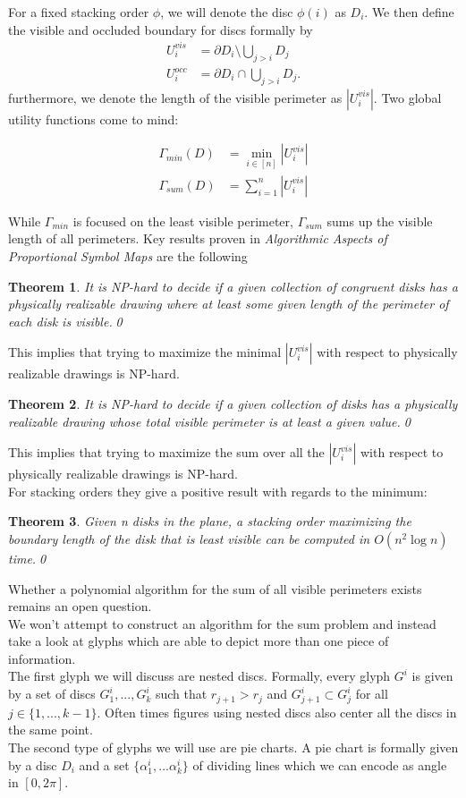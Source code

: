 \documentclass[a4paper,11pt]{article}
\newtheorem{theorem}{Theorem}
\begin{document}
\newpage

For a fixed stacking order $\phi$, we will denote the disc $\phi(i)$ as $D_i$. We then define the visible and occluded boundary for discs formally by\\
%
\begin{align*}
  U_i^{vis} & =\partial D_i\setminus \bigcup_{j>i} D_{j} \\
  U_i^{occ} & =\partial D_i \cap \bigcup_{j>i} D_{j}.
\end{align*}
%
furthermore, we denote the length of the visible perimeter as $|U^{vis}_i|$. Two global utility functions come to mind:

\begin{align*}
    \Gamma_{min} (D) &= \min_{i \in [n]}|U_i^{vis}|\\
    \Gamma_{sum} (D) &= \sum_{i=1}^n|U_i^{vis}|
\end{align*}

While $\Gamma_{min}$ is focused on the least visible perimeter, $\Gamma_{sum}$ sums up the visible length of all perimeters. Key results proven in \textit{Algorithmic Aspects of Proportional Symbol Maps} are the following
\begin{theorem}
  It is NP-hard to decide if a given collection of congruent disks has a
  physically realizable drawing where at least some given length of the perimeter of
  each disk is visible.\qed
\end{theorem}
This implies that trying to maximize the minimal $|U_i^{vis}|$ with respect to physically realizable drawings is NP-hard.
\begin{theorem}
  It is NP-hard to decide if a given collection of disks has a physically
  realizable drawing whose total visible perimeter is at least a given value.\qed
\end{theorem}
This implies that trying to maximize the sum over all the $|U_i^{vis}|$ with respect to physically realizable drawings is NP-hard.\\
For stacking orders they give a positive result with regards to the minimum:
\begin{theorem}
  Given n disks in the plane, a stacking order maximizing the boundary
  length of the disk that is least visible can be computed in $O(n^2 \log n)$ time.\qed
\end{theorem}
Whether a polynomial algorithm for the sum of all visible perimeters exists remains an open question.\\

We won't attempt to construct an algorithm for the sum problem and instead take a look at glyphs which are able to depict more than one piece of information.\\
The first glyph we will discuss are nested discs. Formally, every glyph $G^i$ is given by a set of discs $G^i_1,...,G^i_k$ such that $r_{j+1}>r_j$ and $G^i_{j+1}\subset G^i_j$ for all $j\in \{1,...,k-1 \}$. Often times figures using nested discs also center all the discs in the same point.\\
The second type of glyphs we will use are pie charts. A pie chart is formally given by a disc $D_i$ and a set $\{\alpha_1^i,...\alpha_k^i\}$ of dividing lines which we can encode as angle in $[0,2\pi ]$.\\
\end{document}
